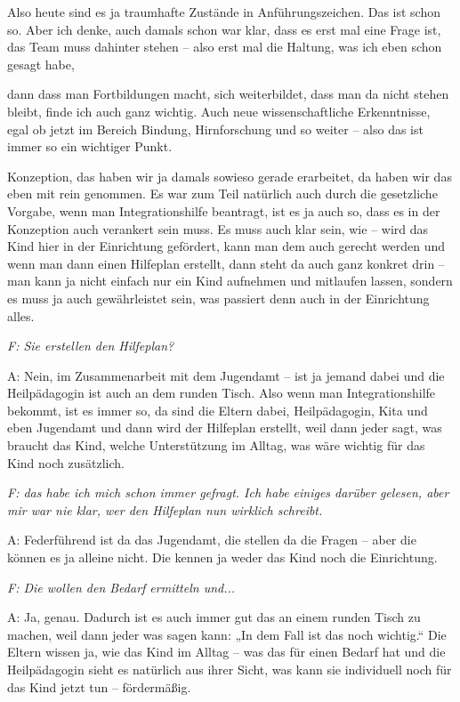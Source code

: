 \begin{linenumbers*}
Also heute sind es ja traumhafte Zustände in Anführungszeichen. Das ist schon so. Aber ich denke, auch damals schon war klar, dass es erst mal eine Frage ist, das Team muss dahinter stehen -- also erst mal die Haltung, was ich eben schon gesagt habe, 

dann dass man Fortbildungen macht, sich weiterbildet, dass man da nicht stehen bleibt, finde ich auch ganz wichtig. Auch neue wissenschaftliche Erkenntnisse, egal ob jetzt im Bereich Bindung, Hirnforschung und so weiter -- also das ist immer so ein wichtiger Punkt. 

Konzeption, das haben wir ja damals sowieso gerade erarbeitet, da haben wir das eben mit rein genommen. Es war zum Teil natürlich auch durch die gesetzliche Vorgabe, wenn man Integrationshilfe beantragt, ist es ja auch so, dass es in der Konzeption auch verankert sein muss. Es muss auch klar sein, wie -- wird das Kind hier in der Einrichtung gefördert, kann man dem auch gerecht werden und wenn man dann einen Hilfeplan erstellt, dann steht da auch ganz konkret drin --  man kann ja nicht einfach nur ein Kind aufnehmen und mitlaufen lassen, sondern es muss ja auch gewährleistet sein, was passiert denn auch in der Einrichtung alles. 

\emph{F: Sie erstellen den Hilfeplan?} 

A: Nein, im Zusammenarbeit mit dem Jugendamt -- ist ja jemand dabei und die Heilpädagogin ist auch an dem runden Tisch. Also wenn man Integrationshilfe bekommt, ist es immer so, da sind die Eltern dabei, Heilpädagogin, Kita und eben Jugendamt und dann wird der Hilfeplan erstellt, weil dann jeder sagt, was braucht das Kind, welche Unterstützung im Alltag, was wäre wichtig für das Kind noch zusätzlich. 

\emph{F: das habe ich mich schon immer gefragt. Ich habe einiges darüber gelesen, aber mir war nie klar, wer den Hilfeplan nun wirklich schreibt.}

A: Federführend ist da das Jugendamt, die stellen da die Fragen -- aber die können es ja alleine nicht. Die kennen ja weder das Kind noch die Einrichtung. 

\emph{F: Die wollen den Bedarf ermitteln und...}

A: Ja, genau. Dadurch ist es auch immer gut das an einem runden Tisch zu machen, weil dann jeder was sagen kann: „In dem Fall ist das noch wichtig.“ Die Eltern wissen ja, wie das Kind im Alltag -- was das für einen Bedarf hat und die Heilpädagogin sieht es natürlich aus ihrer Sicht, was kann sie individuell noch für das Kind jetzt tun -- fördermäßig. 


\end{linenumbers*}
